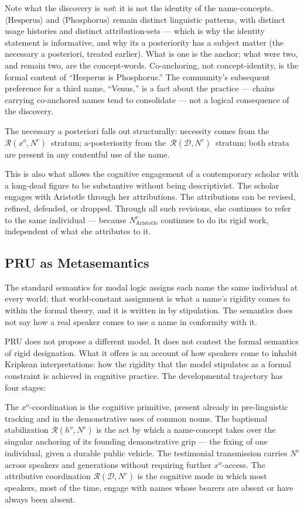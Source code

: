 \documentclass[12pt,a4paper]{article}
\begin{document}
Note what the discovery is \emph{not}: it is not the identity of the name-concepts. \(\langle\text{Hesperus}\rangle\) and \(\langle\text{Phosphorus}\rangle\) remain distinct linguistic patterns, with distinct usage histories and distinct attribution-sets --- which is why the identity statement is informative, and why its a posteriority has a subject matter (the necessary a posteriori, treated earlier). What is one is the anchor; what were two, and remain two, are the concept-words. Co-anchoring, not concept-identity, is the formal content of ``Hesperus is Phosphorus.'' The community's subsequent preference for a third name, ``Venus,'' is a fact about the practice --- chains carrying co-anchored names tend to consolidate --- not a logical consequence of the discovery.

The necessary a posteriori falls out structurally: necessity comes from the~\(\mathcal{R}(x^o,N^c)\)~stratum; a-posteriority from the~\(\mathcal{R}(\mathcal{D},N^c)\)~stratum; both strata are present in any contentful use of the name.

This is also what allows the cognitive engagement of a contemporary scholar with a long-dead figure to be substantive without being descriptivist. The scholar engages with Aristotle through her attributions. The attributions can be revised, refined, defended, or dropped. Through all such revisions, she continues to refer to the same individual --- because \(N^c_{\text{Aristotle}}\) continues to do its rigid work, independent of what she attributes to it.

\subsection{PRU as Metasemantics}\label{pru-as-metasemantics}

The standard semantics for modal logic assigns each name the same individual at every world; that world-constant assignment is what a name's rigidity comes to within the formal theory, and it is written in by stipulation. The semantics does not say how a real speaker comes to use a name in conformity with it.

PRU does not propose a different model. It does not contest the formal semantics of rigid designation. What it offers is an account of how speakers come to inhabit Kripkean interpretations: how the rigidity that the model stipulates as a formal constraint is achieved in cognitive practice. The developmental trajectory has four stages:

The \(x^o\)-coordination is the cognitive primitive, present already in pre-linguistic tracking and in the demonstrative uses of common nouns. The baptismal stabilization \(\mathcal{R}(h^o, N^c)\) is the act by which a name-concept takes over the singular anchoring of its founding demonstrative grip --- the fixing of one individual, given a durable public vehicle. The testimonial transmission carries \(N^c\) across speakers and generations without requiring further \(x^o\)-access. The attributive coordination \(\mathcal{R}(\mathcal{D}, N^c)\) is the cognitive mode in which most speakers, most of the time, engage with names whose bearers are absent or have always been absent.
\end{document}

